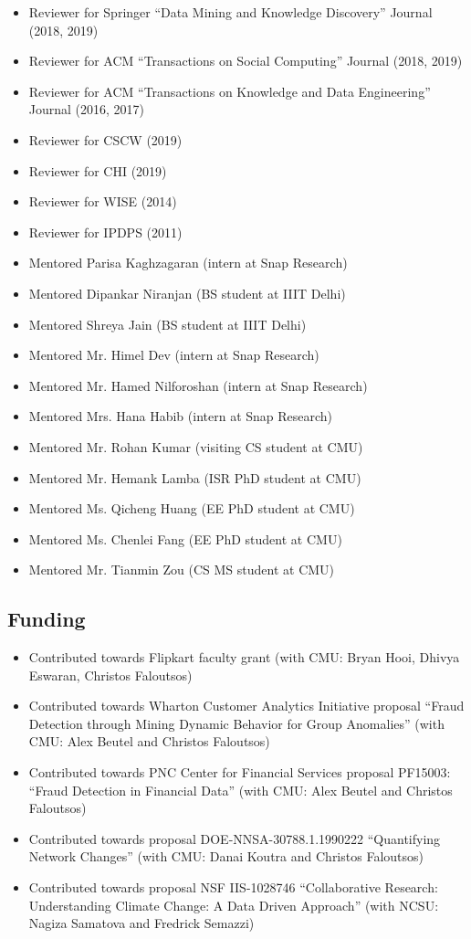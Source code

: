\documentclass{article}
\begin{document}
\begin{itemize}
 \item Reviewer for Springer ``Data Mining and Knowledge Discovery'' Journal (2018, 2019)
 \item Reviewer for ACM ``Transactions on Social Computing'' Journal (2018, 2019)
 \item Reviewer for ACM ``Transactions on Knowledge and Data Engineering'' Journal (2016, 2017)
 \item Reviewer for CSCW (2019)
 \item Reviewer for CHI (2019)
 \item Reviewer for WISE (2014)
 \item Reviewer for IPDPS (2011)
  \item Mentored Parisa Kaghzagaran (intern at Snap Research)
 \item Mentored Dipankar Niranjan (BS student at IIIT Delhi)
 \item Mentored Shreya Jain (BS student at IIIT Delhi)
 \item Mentored Mr. Himel Dev (intern at Snap Research)
 \item Mentored Mr. Hamed Nilforoshan (intern at Snap Research)
 \item Mentored Mrs. Hana Habib (intern at Snap Research)
 \item Mentored Mr. Rohan Kumar (visiting CS student at CMU)
 \item Mentored Mr. Hemank Lamba (ISR PhD student at CMU)
 \item Mentored Ms. Qicheng Huang (EE PhD student at CMU)
 \item Mentored Ms. Chenlei Fang (EE PhD student at CMU)
 \item Mentored Mr. Tianmin Zou (CS MS student at CMU)
\end{itemize}

\subsection*{\bf {Funding}}
\begin{itemize}
\item Contributed towards Flipkart faculty grant (with CMU: Bryan Hooi, Dhivya Eswaran, Christos Faloutsos)
\item Contributed towards Wharton Customer Analytics Initiative proposal ``Fraud Detection through Mining Dynamic Behavior for Group Anomalies'' (with CMU: Alex Beutel and Christos Faloutsos)
\item Contributed towards PNC Center for Financial Services proposal PF15003: ``Fraud Detection in Financial Data'' (with CMU: Alex Beutel and Christos Faloutsos)
\item Contributed towards proposal DOE-NNSA-30788.1.1990222 ``Quantifying Network Changes'' (with CMU: Danai Koutra and Christos Faloutsos)
\item Contributed towards proposal NSF IIS-1028746 ``Collaborative Research:  Understanding Climate Change: A Data Driven Approach'' (with NCSU: Nagiza Samatova and Fredrick Semazzi)
\end{itemize}
\end{document}
